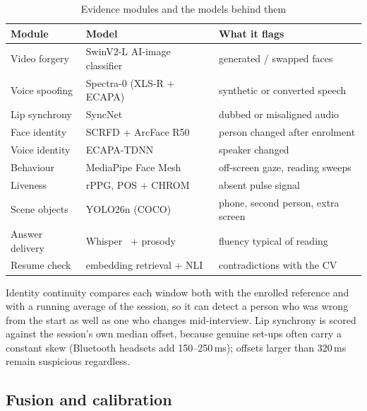 \documentclass[conference]{IEEEtran}
\begin{document}
\begin{table}[t]
\caption{Evidence modules and the models behind them}
\label{tab:modules}
\centering
\scriptsize
\setlength{\tabcolsep}{3pt}
\renewcommand{\arraystretch}{1.1}
\begin{tabular}{@{}>{\raggedright}p{1.45cm}>{\raggedright}p{3.45cm}>{\raggedright\arraybackslash}p{2.95cm}@{}}
\toprule
Module & Model & What it flags \\
\midrule
Video forgery & SwinV2-L AI-image classifier~\cite{liu2022swinv2,aiimagedetector} & generated / swapped faces \\
Voice spoofing & Spectra-0 (XLS-R + ECAPA)~\cite{spectra0} & synthetic or converted speech \\
Lip synchrony & SyncNet~\cite{chung2016syncnet} & dubbed or misaligned audio \\
Face identity & SCRFD + ArcFace R50~\cite{guo2022scrfd,deng2019arcface} & person changed after enrolment \\
Voice identity & ECAPA-TDNN~\cite{desplanques2020ecapa} & speaker changed \\
Behaviour & MediaPipe Face Mesh~\cite{kartynnik2019facemesh} & off-screen gaze, reading sweeps \\
Liveness & rPPG, POS + CHROM~\cite{wang2017pos,dehaan2013chrom} & absent pulse signal \\
Scene objects & YOLO26n (COCO) & phone, second person, extra screen \\
Answer delivery & Whisper~\cite{radford2023whisper} + prosody & fluency typical of reading \\
Resume check & embedding retrieval + NLI & contradictions with the CV \\
\bottomrule
\end{tabular}
\end{table}

Identity continuity compares each window both with the enrolled reference and with a running average of the
session, so it can detect a person who was wrong from the start as well as one who changes mid-interview. Lip
synchrony is scored against the session's own median offset, because genuine set-ups often carry a constant
skew (Bluetooth headsets add 150--250\,ms); offsets larger than 320\,ms remain suspicious regardless.

\subsection{Fusion and calibration}
\end{document}
